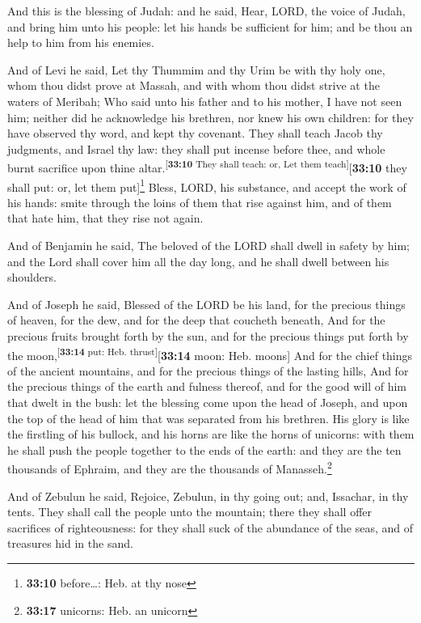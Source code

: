  And this is the blessing of Judah: and he said, Hear,
LORD, the voice of Judah, and bring him unto his people: let his hands
be sufficient for him; and be thou an help to him from his enemies.

 And of Levi he said, Let thy Thummim and thy Urim be with
thy holy one, whom thou didst prove at Massah, and with whom thou didst
strive at the waters of Meribah;  Who said unto his father
and to his mother, I have not seen him; neither did he acknowledge his
brethren, nor knew his own children: for they have observed thy word,
and kept thy covenant.  They shall teach Jacob thy
judgments, and Israel thy law: they shall put incense before thee, and
whole burnt sacrifice upon thine
altar.\textsuperscript{{[}\textbf{33:10} They shall teach: or, Let them
teach{]}}{[}\textbf{33:10} they shall put: or, let them
put{]}\footnote{\textbf{33:10} before\ldots: Heb. at thy nose}
 Bless, LORD, his substance, and accept the work of his
hands: smite through the loins of them that rise against him, and of
them that hate him, that they rise not again.

 And of Benjamin he said, The beloved of the LORD shall
dwell in safety by him; and the Lord shall cover him all the day long,
and he shall dwell between his shoulders.

 And of Joseph he said, Blessed of the LORD be his land,
for the precious things of heaven, for the dew, and for the deep that
coucheth beneath,  And for the precious fruits brought
forth by the sun, and for the precious things put forth by the
moon,\textsuperscript{{[}\textbf{33:14} put: Heb.
thrust{]}}{[}\textbf{33:14} moon: Heb. moons{]}  And for
the chief things of the ancient mountains, and for the precious things
of the lasting hills,  And for the precious things of the
earth and fulness thereof, and for the good will of him that dwelt in
the bush: let the blessing come upon the head of Joseph, and upon the
top of the head of him that was separated from his brethren.
 His glory is like the firstling of his bullock, and his
horns are like the horns of unicorns: with them he shall push the people
together to the ends of the earth: and they are the ten thousands of
Ephraim, and they are the thousands of Manasseh.\footnote{\textbf{33:17}
  unicorns: Heb. an unicorn}

 And of Zebulun he said, Rejoice, Zebulun, in thy going
out; and, Issachar, in thy tents.  They shall call the
people unto the mountain; there they shall offer sacrifices of
righteousness: for they shall suck of the abundance of the seas, and of
treasures hid in the sand.

